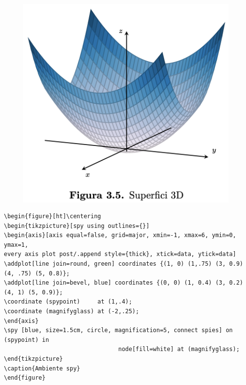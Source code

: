 \begin{figure}[ht]\centering
\includegraphics[scale=.6]{FileAusiliari/Screenshots/Figura3-5.png}
\end{figure}

\newpage

\begin{verbatim}
\begin{figure}[ht]\centering
\begin{tikzpicture}[spy using outlines={}]
\begin{axis}[axis equal=false, grid=major, xmin=-1, xmax=6, ymin=0, ymax=1,
every axis plot post/.append style={thick}, xtick=data, ytick=data]
\addplot[line join=round, green] coordinates {(1, 0) (1,.75) (3, 0.9) (4, .75) (5, 0.8)};
\addplot[line join=bevel, blue] coordinates {(0, 0) (1, 0.4) (3, 0.2) (4, 1) (5, 0.9)};
\coordinate (spypoint)     at (1,.4);
\coordinate (magnifyglass) at (-2,.25);
\end{axis}
\spy [blue, size=1.5cm, circle, magnification=5, connect spies] on (spypoint) in
                                 node[fill=white] at (magnifyglass);
\end{tikzpicture}	
\caption{Ambiente spy}
\end{figure}
\end{verbatim}

